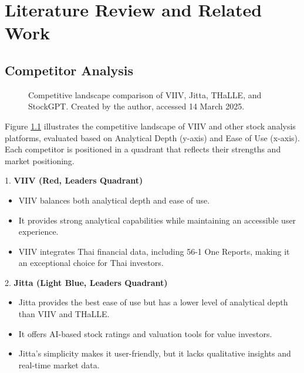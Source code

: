 \chapter{Literature Review and Related Work}
\label{chap:relatedworks}

\section{Competitor Analysis}
\label{section:competitor-analysis}

\begin{figure}[h]
    \centering
    \caption[Competitive landscape comparison of VIIV, Jitta, THaLLE, and StockGPT]{Competitive landscape comparison of VIIV, Jitta, THaLLE, and StockGPT. Created by the author, accessed 14 March 2025.}
    \label{fig:competitive-landscape}
\end{figure}

Figure \ref{fig:competitive-landscape} illustrates the competitive landscape of VIIV and other stock analysis platforms, evaluated based on Analytical Depth (y-axis) and Ease of Use (x-axis). 
Each competitor is positioned in a quadrant that reflects their strengths and market positioning.

1. \textbf{VIIV (Red, Leaders Quadrant)}

\begin{itemize}[leftmargin=80pt]
    \item VIIV balances both analytical depth and ease of use.
    \item It provides strong analytical capabilities while maintaining an accessible user experience.
    \item VIIV integrates Thai financial data, including 56-1 One Reports, making it an exceptional choice for Thai investors.
\end{itemize}

2. \textbf{Jitta (Light Blue, Leaders Quadrant)}

\begin{itemize}[leftmargin=80pt]
    \item Jitta provides the best ease of use but has a lower level of analytical depth than VIIV and THaLLE.
    \item It offers AI-based stock ratings and valuation tools for value investors.
    \item Jitta’s simplicity makes it user-friendly, but it lacks qualitative insights and real-time market data.
\end{itemize}

